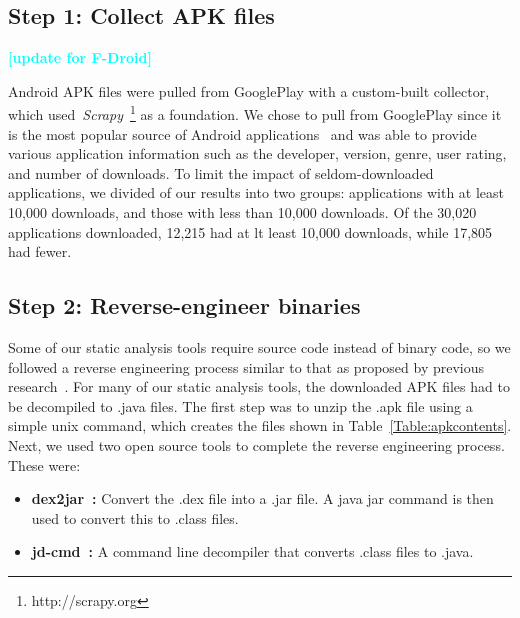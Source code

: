 \documentclass[conference]{IEEEtran}
\newcommand{\todo}[1]{\textcolor{cyan}{\textbf{[#1]}}}
\newcommand{\dan}[1]{\textcolor{blue}{{\it [Dan says: #1]}}}
\begin{document}
\label{sec: collection}
\subsection{Step 1: Collect APK files}
\todo{update for F-Droid}

Android APK files were pulled from GooglePlay with a custom-built collector, which used~\emph{Scrapy}~\footnote{http://scrapy.org} as a foundation. We chose to pull from GooglePlay since it is the most popular source of Android applications~\cite{listofstores_URL} and was able to provide various application information such as the developer, version, genre, user rating, and number of downloads. To limit the impact of seldom-downloaded applications, we divided of our results into two groups: applications with at least 10,000 downloads, and those with less than 10,000 downloads. Of the 30,020 applications downloaded, 12,215 had at lt least 10,000 downloads, while 17,805 had fewer.


\subsection{Step 2: Reverse-engineer binaries}
\label{sec: decompliation}

Some of our static analysis tools require source code instead of binary code, so we followed a reverse engineering process similar to that as proposed by previous research~\cite{Lee_2013,6687155}. For many of our static analysis tools, the downloaded APK files had to be decompiled to .java files. The first step was to unzip the .apk file using a simple unix command, which creates the files shown in Table~\ref{Table:apkcontents}. Next, we used two open source tools to complete the reverse engineering process. These were:

\begin{itemize}
  \item \textbf{dex2jar~\cite{dex2jar_key}:} Convert the .dex file into a .jar file. A java jar command is then used to convert this to .class files.
  \item \textbf{jd-cmd~\cite{jdcmd_key}:} A command line decompiler that converts .class files to .java.
\end{itemize}
\end{document}
